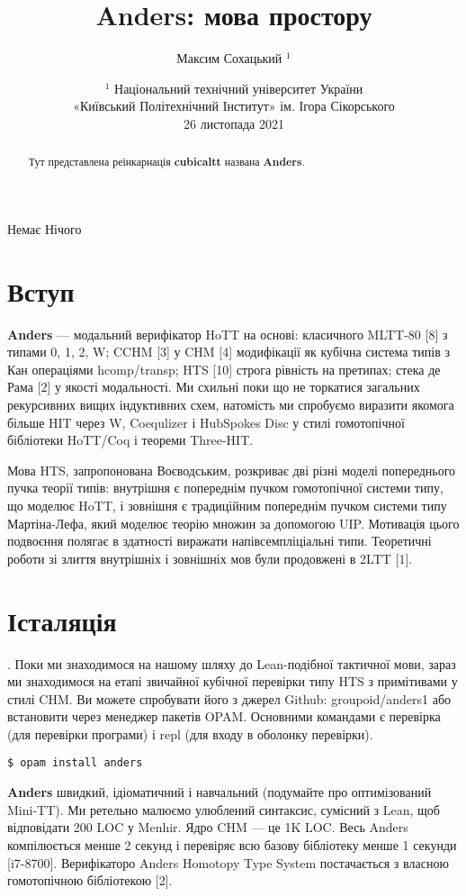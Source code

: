 \documentclass{article}
\theoremstyle{definition}
\begin{document}
\newpage Немає Нічого \newpage
\title{Anders: мова простору}
\author{Максим Сохацький $^1$}
\date{ \small $^1$ Національний технічний університет України \\
       «Київський Політехнічний Інститут» ім. Ігора Сікорського \\
       26 листопада 2021 }
\maketitle

\begin{abstract}
Тут представлена реінкарнація \textbf{cubicaltt} названа \textbf{Anders}.
\end{abstract}

\section*{Вступ}

\textbf{Anders} — модальний верифікатор HoTT на основі: класичного MLTT-80 [8]
з типами 0, 1, 2, W; CCHM [3] у CHM [4] модифікації як кубічна
система типів з Кан операціями hcomp/transp; HTS [10] строга рівність
на претипах; стека де Рама [2] у якості модальності. Ми схильні поки
що не торкатися загальних рекурсивних вищих індуктивних схем,
натомість ми спробуємо виразити якомога більше HIT через W, Coequlizer
і HubSpokes Disc у стилі гомотопічної бібліотеки HoTT/Coq і теореми Three-HIT.

Мова HTS, запропонована Воєводським, розкриває дві різні моделі
попереднього пучка теорії типів: внутрішня є попереднім пучком
гомотопічної системи типу, що моделює HoTT, і зовнішня є традиційним
попереднім пучком системи типу Мартіна-Лефа, який моделює теорію множин
за допомогою UIP. Мотивація цього подвоєння полягає в здатності виражати
напівсемпліціальні типи. Теоретичні роботи зі злиття внутрішніх і
зовнішніх мов були продовжені в 2LTT [1].

\newpage
\section{Істаляція}. Поки ми знаходимося на нашому шляху до Lean-подібної
тактичної мови, зараз ми знаходимося на етапі звичайної кубічної перевірки
типу HTS з примітивами у стилі CHM. Ви можете спробувати його з джерел
Github: groupoid/anders1 або встановити через менеджер пакетів OPAM.
Основними командами є перевірка (для перевірки програми) і repl (для входу в оболонку перевірки).
\begin{lstlisting}
$ opam install anders
\end{lstlisting}

\textbf{Anders} швидкий, ідіоматичний і навчальний (подумайте про оптимізований Mini-TT).
Ми ретельно малюємо улюблений синтаксис, сумісний з Lean, щоб відповідати 200
LOC у Menhir. Ядро CHM — це 1K LOC. Весь Anders компілюється менше 2 секунд і
перевіряє всю базову бібліотеку менше 1 секунди [i7-8700]. Верифікаторо Anders
Homotopy Type System постачається з власною гомотопічною бібліотекою [2].
\end{document}
